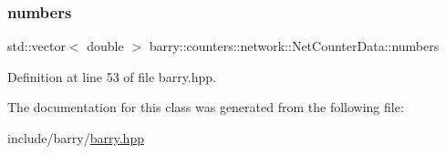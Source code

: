 \mbox{\label{classbarry_1_1counters_1_1network_1_1_net_counter_data_a720381c090feafdf9652f0ca19c5cc4b}} 
\subsubsection{\texorpdfstring{numbers}{numbers}}
{\footnotesize\ttfamily std\+::vector$<$ double $>$ barry\+::counters\+::network\+::\+Net\+Counter\+Data\+::numbers}



Definition at line 53 of file barry.\+hpp.



The documentation for this class was generated from the following file\+:\begin{DoxyCompactItemize}
\item 
include/barry/\hyperlink{barry_8hpp}{barry.\+hpp}\end{DoxyCompactItemize}

